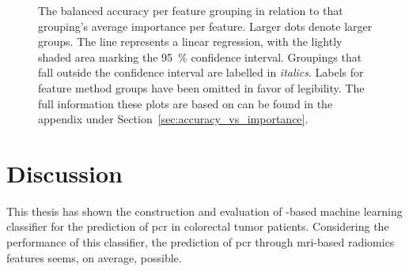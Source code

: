 \begin{figure}[H]
    \centering
    \caption{The balanced accuracy per feature grouping in relation to that grouping's average importance per feature. Larger dots denote larger groups. The line represents a linear regression, with the lightly shaded area marking the \SI{95}{\percent} confidence interval. Groupings that fall outside the confidence interval are labelled in \textit{italics}. Labels for feature method groups have been omitted in favor of legibility. The full information these plots are based on can be found in the appendix under Section~\ref{sec:accuracy_vs_importance}.}\label{fig:accuracy_vs_importance}
\end{figure}







\newpage{}
\section{Discussion}\label{sec:discussion}

This thesis has shown the construction and evaluation of -based 
machine learning classifier for the prediction of \ac{pcr} in colorectal 
tumor patients. Considering the performance of this classifier, the 
prediction of \ac{pcr} through \ac{mri}-based radiomics features seems, on 
average, possible.

